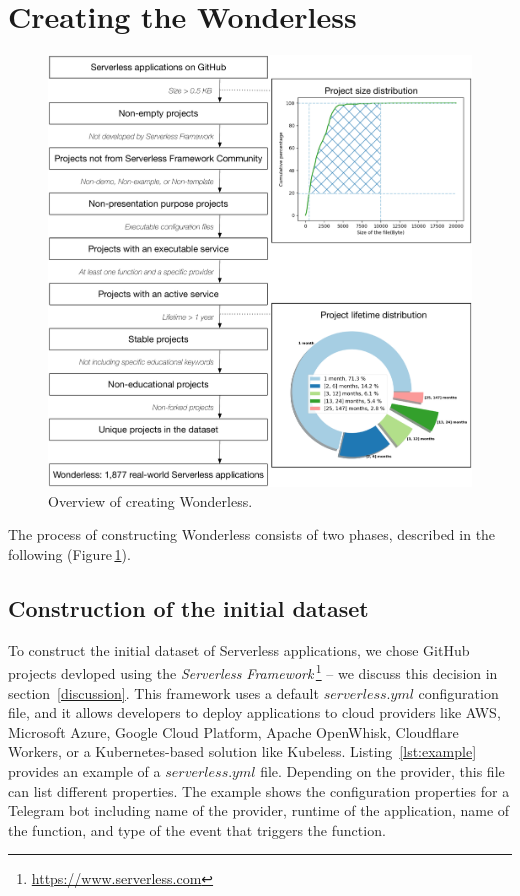 
\section{Creating the Wonderless}
\label{dataset}

\begin{figure}
	\centering
	\includegraphics[scale=0.295]{figures/processOverviewFinalgraffle}
	\caption{Overview of creating Wonderless.}
	\label{fig:overview}
\end{figure}



The  process of constructing Wonderless
consists of two phases, described in the following (Figure\,\ref{fig:overview}).

\subsection{Construction of the initial dataset} \label{phaseA}

To construct the initial dataset of Serverless applications, we chose GitHub projects 
devloped using the \emph{Serverless Framework}\,\footnote{\url{https://www.serverless.com}} 
-- we discuss this decision in section~\ref{discussion}.
This framework uses a default $serverless.yml$ configuration file, 
and it allows developers to deploy 
applications to cloud providers like AWS, Microsoft Azure, Google Cloud 
Platform, Apache OpenWhisk, Cloudflare Workers, or a Kubernetes-based 
solution like Kubeless.
%
Listing~\ref{lst:example} provides an example of a $serverless.yml$ file. 
Depending on the provider, this file can list different properties.
The example shows the configuration properties for a Telegram bot including 
name of the provider, runtime of the application, name of the function, 
and type of the event that triggers the function. 

